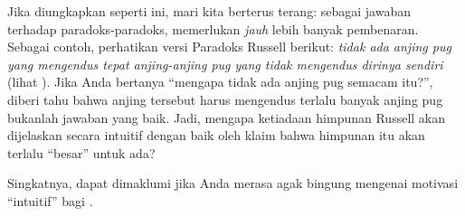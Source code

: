 \documentclass[../../../include/open-logic-section]{subfiles}
\begin{document}
Jika diungkapkan seperti ini, mari kita berterus terang: sebagai jawaban
terhadap paradoks-paradoks, \limofsize{} memerlukan \emph{jauh} lebih banyak
pembenaran. Sebagai contoh, perhatikan versi Paradoks Russell berikut:
\emph{tidak ada anjing pug yang mengendus tepat anjing-anjing pug yang tidak
mengendus dirinya sendiri} (lihat ). Jika Anda
bertanya ``mengapa tidak ada anjing pug semacam itu?'', diberi tahu bahwa
anjing tersebut harus mengendus terlalu banyak anjing pug bukanlah jawaban
yang baik. Jadi, mengapa ketiadaan himpunan Russell akan dijelaskan secara
intuitif dengan baik oleh klaim bahwa himpunan itu akan terlalu ``besar''
untuk ada?

Singkatnya, dapat dimaklumi jika Anda merasa agak bingung mengenai motivasi
``intuitif'' bagi \limofsize.
\end{document}
